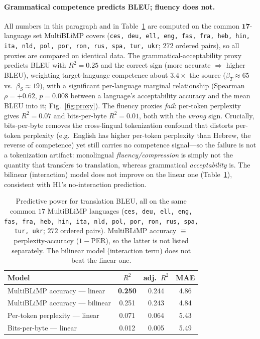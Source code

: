 \documentclass[11pt]{article}
\begin{document}
\paragraph{Grammatical competence predicts BLEU; fluency does not.} All numbers
in this paragraph and in Table~\ref{tab:proxy} are computed on the common
$\mathbf{17}$-language set MultiBLiMP covers
(\texttt{ces, deu, ell, eng, fas, fra, heb, hin, ita, nld, pol, por, ron, rus,
spa, tur, ukr}; $272$ ordered pairs), so all proxies are compared on identical
data. The grammatical-acceptability proxy predicts BLEU with $R^2 = 0.25$ and
the correct sign (more accurate $\Rightarrow$ higher BLEU), weighting
target-language competence about $3.4\times$ the source ($\beta_T \approx 65$
vs.\ $\beta_S \approx 19$), with a significant per-language marginal relationship
(Spearman $\rho = +0.62$, $p = 0.008$ between a language's acceptability accuracy
and the mean BLEU into it; Fig.~\ref{fig:proxy}). The fluency proxies
\emph{fail}: per-token perplexity gives $R^2 = 0.07$ and bits-per-byte
$R^2 = 0.01$, both with the \emph{wrong} sign. Crucially, bits-per-byte removes
the cross-lingual tokenization confound that distorts per-token perplexity (e.g.\
English has higher per-token perplexity than Hebrew, the reverse of competence)
yet still carries no competence signal---so the failure is not a tokenization
artifact: monolingual \emph{fluency/compression} is simply not the quantity that
transfers to translation, whereas grammatical \emph{acceptability} is. The
bilinear (interaction) model does not improve on the linear one
(Table~\ref{tab:proxy}), consistent with H1's no-interaction prediction.

\begin{table}[t]
\centering
\small
\begin{tabular}{lccc}
\toprule
Model & $R^2$ & adj.\ $R^2$ & MAE \\
\midrule
MultiBLiMP accuracy --- linear   & \textbf{0.250} & 0.244 & 4.86 \\
MultiBLiMP accuracy --- bilinear & 0.251 & 0.243 & 4.84 \\
Per-token perplexity --- linear  & 0.071 & 0.064 & 5.43 \\
Bits-per-byte --- linear         & 0.012 & 0.005 & 5.49 \\
\bottomrule
\end{tabular}
\caption{Predictive power for translation BLEU, all on the same common $17$
MultiBLiMP languages (\texttt{ces, deu, ell, eng, fas, fra, heb, hin, ita, nld,
pol, por, ron, rus, spa, tur, ukr}; $272$ ordered pairs). MultiBLiMP accuracy
$\equiv$ perplexity-accuracy ($1-$PER), so the latter is not listed separately.
The bilinear model (interaction term) does not beat the linear one.}
\label{tab:proxy}
\end{table}
\end{document}
